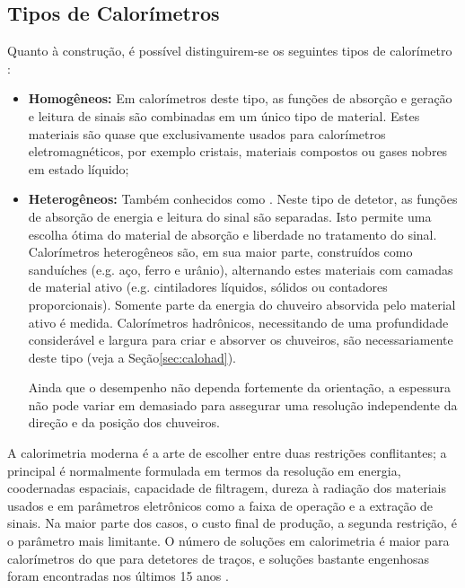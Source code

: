 \subsection{Tipos de Calorímetros}

Quanto à construção, é possível distinguirem-se os seguintes tipos de
calorímetro \cite{bock:detector, hadcal}:

\begin{itemize}
  \item \textbf{Homogêneos:} Em calorímetros
  deste tipo, as funções de absorção e geração e leitura de sinais são
  combinadas em um único tipo de material. Estes materiais são quase que
  exclusivamente usados para calorímetros eletromagnéticos, por exemplo
  cristais, materiais compostos ou gases nobres em estado líquido;

  \item \textbf{Heterogêneos:} Tam\-bém
  conhecidos como . Neste tipo de
  detetor, as fun\-ções de ab\-sor\-ção de energia e leitura do sinal são
  separadas. Isto permite uma escolha ótima do material de absorção e
  liberdade no tratamento do sinal. Calorímetros heterogêneos são, em sua
  maior parte, construídos como sanduíches (e.g. aço, ferro e urânio),
  alternando estes materiais com camadas de material ativo (e.g. cintiladores
  líquidos, sólidos ou contadores proporcionais). Somente parte da energia do
  chuveiro absorvida pelo material ativo é medida. Calorímetros hadrônicos,
  necessitando de uma profundidade considerável e largura para criar e
  absorver os chuveiros, são necessariamente deste tipo (veja a
  Seção\ref{sec:calohad}).

  Ainda que o desempenho não dependa fortemente da orientação, a espessura não
  pode variar em demasiado para assegurar uma resolução independente da
  direção e da posição dos chuveiros.
\end{itemize}

A calorimetria moderna é a arte de escolher entre duas restrições
conflitantes; a principal é normalmente formulada em termos da resolução em
energia, coodernadas espaciais, capacidade de filtragem, dureza à radiação dos
materiais usados e em parâmetros eletrônicos como a faixa de operação e a
extração de sinais. Na maior parte dos casos, o custo final de produção, a
segunda restrição, é o parâmetro mais limitante. O número de soluções em
calorimetria é maior para calorímetros do que para detetores de traços, e
soluções bastante engenhosas foram encontradas nos últimos 15 anos
\cite{hadcal}.

